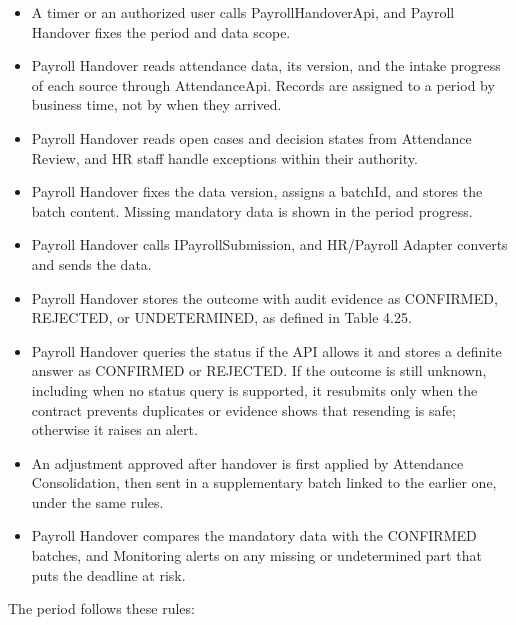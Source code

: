\begin{itemize}[leftmargin=30pt, labelwidth=24pt, labelsep=6pt, align=left, itemsep=3pt, topsep=4pt, parsep=2pt]
  \item[\textbf{C1}] A timer or an authorized user calls PayrollHandoverApi, and Payroll Handover fixes the period and data scope.
  \item[\textbf{C2}] Payroll Handover reads attendance data, its version, and the intake progress of each source through AttendanceApi. Records are assigned to a period by business time, not by when they arrived.
  \item[\textbf{C3}] Payroll Handover reads open cases and decision states from Attendance Review, and HR staff handle exceptions within their authority.
  \item[\textbf{C4}] Payroll Handover fixes the data version, assigns a batchId, and stores the batch content. Missing mandatory data is shown in the period progress.
  \item[\textbf{C5}] Payroll Handover calls IPayrollSubmission, and HR/Payroll Adapter converts and sends the data.
  \item[\textbf{C6}] Payroll Handover stores the outcome with audit evidence as CONFIRMED, REJECTED, or UNDETERMINED, as defined in Table 4.25.
  \item[\textbf{C7}] Payroll Handover queries the status if the API allows it and stores a definite answer as CONFIRMED or REJECTED. If the outcome is still unknown, including when no status query is supported, it resubmits only when the contract prevents duplicates or evidence shows that resending is safe; otherwise it raises an alert.
  \item[\textbf{C8}] An adjustment approved after handover is first applied by Attendance Consolidation, then sent in a supplementary batch linked to the earlier one, under the same rules.
  \item[\textbf{C9}] Payroll Handover compares the mandatory data with the CONFIRMED batches, and Monitoring alerts on any missing or undetermined part that puts the deadline at risk.
\end{itemize}



\medskip


The period follows these rules:

